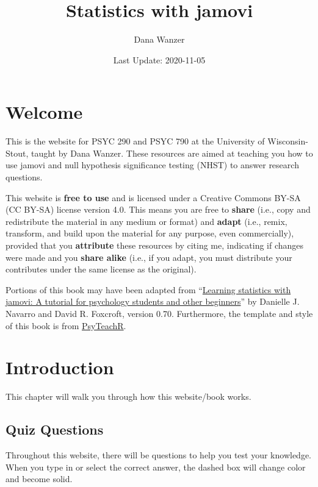 \documentclass[
]{book}
\title{Statistics with jamovi}
\author{Dana Wanzer}
\date{Last Update: 2020-11-05}
\begin{document}
\maketitle

{
\setcounter{tocdepth}{1}
\tableofcontents
}
\hypertarget{welcome}{%
\chapter*{Welcome}\label{welcome}}

This is the website for PSYC 290 and PSYC 790 at the University of Wisconsin-Stout, taught by Dana Wanzer. These resources are aimed at teaching you how to use jamovi and null hypothesis significance testing (NHST) to answer research questions.

This website is \textbf{free to use} and is licensed under a Creative Commons BY-SA (CC BY-SA) license version 4.0. This means you are free to \textbf{share} (i.e., copy and redistribute the material in any medium or format) and \textbf{adapt} (i.e., remix, transform, and build upon the material for any purpose, even commercially), provided that you \textbf{attribute} these resources by citing me, indicating if changes were made and you \textbf{share alike} (i.e., if you adapt, you must distribute your contributes under the same license as the original).

Portions of this book may have been adapted from ``\href{http://www.learnstatswithjamovi.com}{Learning statistics with jamovi: A tutorial for psychology students and other beginners}'' by Danielle J. Navarro and David R. Foxcroft, version 0.70. Furthermore, the template and style of this book is from \href{https://psyteachr.github.io/book-template/setup.html}{PsyTeachR}.

\hypertarget{introduction}{%
\chapter{Introduction}\label{introduction}}

This chapter will walk you through how this website/book works.

\hypertarget{quiz-questions}{%
\section{Quiz Questions}\label{quiz-questions}}

Throughout this website, there will be questions to help you test your knowledge. When you type in or select the correct answer, the dashed box will change color and become solid.
\end{document}

